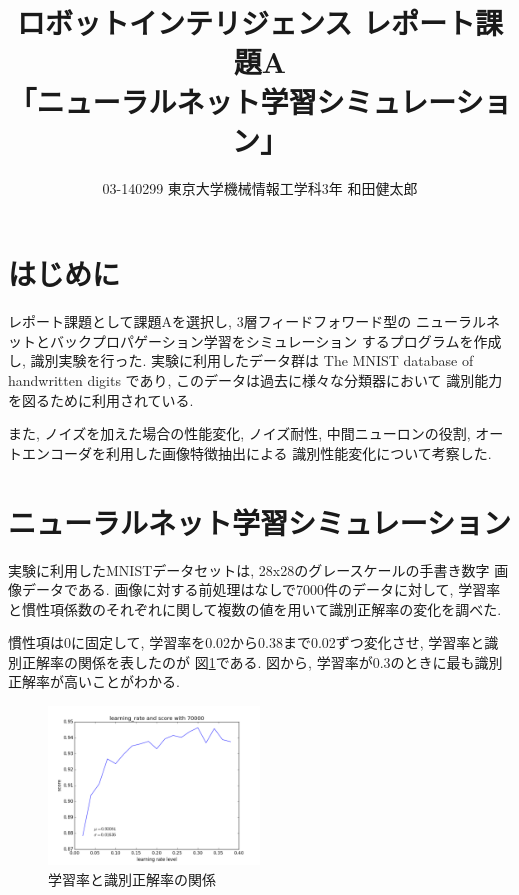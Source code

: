 \documentclass[10pt]{jarticle}
\title{ロボットインテリジェンス レポート課題A \\
      「ニューラルネット学習シミュレーション」}
\author{03-140299 東京大学機械情報工学科3年 和田健太郎}
\begin{document}
\maketitle

\section{はじめに}
レポート課題として課題Aを選択し, 3層フィードフォワード型の
ニューラルネットとバックプロパゲーション学習をシミュレーション
するプログラムを作成し, 識別実験を行った. 
実験に利用したデータ群は
The MNIST database of handwritten digits
であり, このデータは過去に様々な分類器において
識別能力を図るために利用されている. \cite{mnist}

また, ノイズを加えた場合の性能変化, ノイズ耐性, 
中間ニューロンの役割, オートエンコーダを利用した画像特徴抽出による
識別性能変化について考察した. 

\section{ニューラルネット学習シミュレーション}
実験に利用したMNISTデータセットは, 28x28のグレースケールの手書き数字
画像データである. 画像に対する前処理はなしで7000件のデータに対して,
学習率と慣性項係数のそれぞれに関して複数の値を用いて識別正解率の変化を調べた. 

慣性項は0に固定して, 学習率を0.02から0.38まで0.02ずつ変化させ,
学習率と識別正解率の関係を表したのが
図\ref{fig:learning-rate-score-var}である. 
図から, 学習率が0.3のときに最も識別正解率が高いことがわかる. 
\begin{figure}[htbp]
  \centering
  \includegraphics[width=0.5\textwidth]{assets/img/learning_rate_test_mnist_70000.pdf}
  \caption{学習率と識別正解率の関係}
  \label{fig:learning-rate-score-var}
\end{figure}
\end{document}
